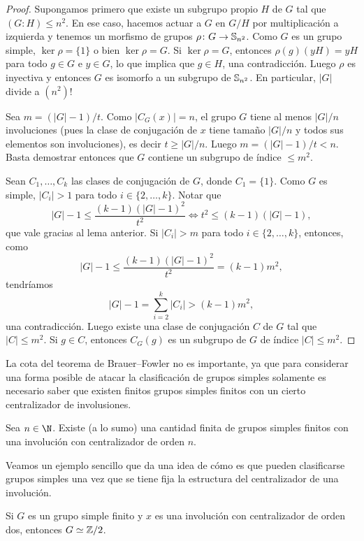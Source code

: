 \begin{proof}
Supongamos primero que existe un subgrupo propio $H$ de $G$ tal que
$(G:H)\leq n^2$. En ese caso, hacemos actuar a $G$ en $G/H$ por multiplicación a izquierda 
y tenemos un morfismo de grupos $\rho\colon G\to\mathbb{S}_{n^2}$. Como $G$ es un grupo simple, 
$\ker\rho=\{1\}$ o bien $\ker\rho=G$. Si $\ker\rho=G$, entonces $\rho(g)(yH)=yH$ para todo
$g\in G$ e $y\in G$, lo que implica que $g\in H$, una contradicción. Luego $\rho$ es inyectiva
y entonces $G$ es isomorfo a un subgrupo de $\mathbb{S}_{n^2}$. En particular, $|G|$ divide a $(n^2)!$

Sea $m=(|G|-1)/t$. 
Como $|C_G(x)|=n$, el grupo $G$ tiene al menos $|G|/n$ involuciones (pues la clase de conjugación
de $x$ tiene tamaño $|G|/n$ y todos sus elementos son involuciones), es decir $t\geq |G|/n$. Luego
$m=(|G|-1)/t<n$. Basta demostrar entonces que $G$ contiene un subgrupo de índice $\leq m^2$. 

Sean $C_1,\dots,C_k$ las clases de conjugación de $G$, donde $C_1=\{1\}$. 
Como $G$ es simple, $|C_i|>1$ 
para todo $i\in\{2,\dots,k\}$. Notar que 
\[
|G|-1\leq\frac{(k-1)(|G|-1)^2}{t^2}\Longleftrightarrow t^2\leq(k-1)(|G|-1),
\]
que vale gracias al lema anterior. 
Si $|C_i|>m$ para todo $i\in\{2,\dots,k\}$, entonces, como
\[
|G|-1\leq\frac{(k-1)(|G|-1)^2}{t^2}=(k-1)m^2,
\]
tendríamos 
\[
|G|-1=\sum_{i=2}^k|C_i|>(k-1)m^2,
\]
una contradicción. Luego existe una clase de conjugación $C$ de $G$ tal que $|C|\leq m^2$. Si $g\in C$, entonces
$C_G(g)$ es un subgrupo de $G$ de índice $|C|\leq m^2$.
\end{proof}

La cota del teorema de Brauer--Fowler no es importante, ya que
para considerar una forma posible de atacar la clasificación de grupos simples 
solamente es necesario saber que existen  
finitos grupos simples finitos con un cierto centralizador de involusiones.

\begin{corollary}
    Sea $n\in\N$. Existe (a lo sumo) una cantidad finita de grupos simples 
    finitos con una involución con centralizador de orden $n$. 
\end{corollary}

Veamos un ejemplo sencillo que da una idea de cómo es que pueden clasificarse grupos simples
una vez que se tiene fija la estructura del centralizador de una involución. 

\begin{exercise}
Si $G$ es un grupo simple finito y $x$ es una involución con centralizador de orden dos, entonces 
$G\simeq\mathbb{Z}/2$. 
\end{exercise}

